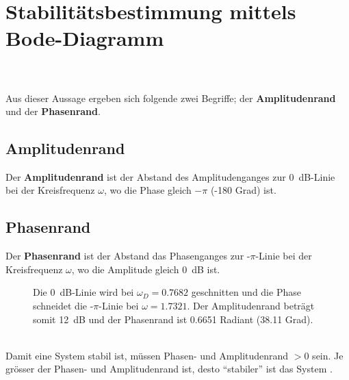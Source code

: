{\section{Stabilit\"atsbestimmung mittels Bode-Diagramm}
\\~\\
Aus dieser Aussage ergeben sich folgende zwei Begriffe; der {\bf
  Amplitudenrand} und der {\bf
  Phasenrand}.
\subsection{Amplitudenrand}
Der {\bf Amplitudenrand} ist der Abstand des Amplitudenganges zur 0~dB-Linie bei der Kreisfrequenz $\omega$, wo die Phase gleich $-\pi$ (-180 Grad) ist.
\subsection{Phasenrand}
Der   {\bf Phasenrand} ist der Abstand das Phasenganges zur -$\pi$-Linie bei der Kreisfrequenz $\omega$, wo die Amplitude gleich 0~dB ist.
\vspace*{-3mm}
\begin{figure}[!htb]
\vspace*{-5mm}%
\begin{center}
  \vspace*{-3mm}\caption{Die 0~dB-Linie wird bei $\omega_D=0.7682$ geschnitten und die Phase schneidet die -$\pi$-Linie bei $\omega=1.7321$. Der Amplitudenrand betr\"agt somit 12~dB und der Phasenrand ist 0.6651 Radiant (38.11 Grad).}
\end{center}
\vspace*{-8mm}
\end{figure}\\
\nit Damit eine System stabil ist, m\"ussen Phasen- und Amplitudenrand
$>0$ sein. Je gr\"osser der Phasen- und Amplitudenrand ist, desto
``stabiler'' ist das System \cite{UNB:81}.  
\newpage
\vspace*{-9mm}
\begin{figure}[!htb]
\vspace*{-5mm}%


\end{figure}}
